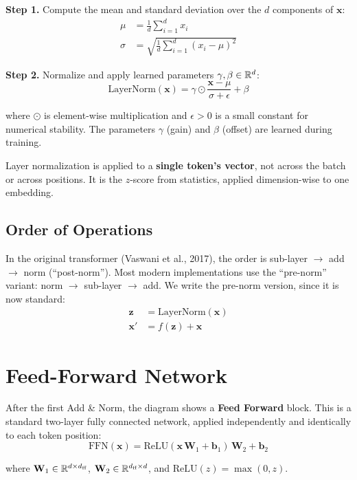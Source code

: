 \documentclass[main.tex]{subfiles}
\begin{document}
\textbf{Step 1.} Compute the mean and standard deviation over the $d$ components of $\mathbf{x}$:
\begin{align}
\mu &= \frac{1}{d} \sum_{i=1}^{d} x_i \\[6pt]
\sigma &= \sqrt{\frac{1}{d} \sum_{i=1}^{d} (x_i - \mu)^2}
\end{align}

\textbf{Step 2.} Normalize and apply learned parameters $\gamma, \beta \in \mathbb{R}^d$:
$$\text{LayerNorm}(\mathbf{x}) = \gamma \odot \frac{\mathbf{x} - \mu}{\sigma + \epsilon} + \beta$$

where $\odot$ is element-wise multiplication and $\epsilon > 0$ is a small constant for numerical stability. The parameters $\gamma$ (gain) and $\beta$ (offset) are learned during training.

\begin{remark}
Layer normalization is applied to a \textbf{single token's vector}, not across the batch or across positions. It is the $z$-score from statistics, applied dimension-wise to one embedding.
\end{remark}

\subsection{Order of Operations}

In the original transformer (Vaswani et al., 2017), the order is sub-layer $\to$ add $\to$ norm (``post-norm''). Most modern implementations use the ``pre-norm'' variant: norm $\to$ sub-layer $\to$ add. We write the pre-norm version, since it is now standard:
\begin{align}
\mathbf{z} &= \text{LayerNorm}(\mathbf{x}) \\
\mathbf{x}' &= f(\mathbf{z}) + \mathbf{x}
\end{align}

\needspace{0.33\textheight}
\section{Feed-Forward Network}

After the first Add \& Norm, the diagram shows a \textbf{Feed Forward} block. This is a standard two-layer fully connected network, applied independently and identically to each token position:
$$\text{FFN}(\mathbf{x}) = \text{ReLU}(\mathbf{x}\,\mathbf{W}_1 + \mathbf{b}_1)\,\mathbf{W}_2 + \mathbf{b}_2$$

where $\mathbf{W}_1 \in \mathbb{R}^{d \times d_{\text{ff}}}$, $\mathbf{W}_2 \in \mathbb{R}^{d_{\text{ff}} \times d}$, and $\text{ReLU}(z) = \max(0, z)$.
\end{document}
